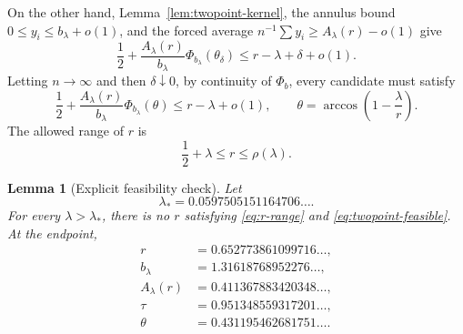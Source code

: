 \documentclass[11pt]{article}
\newtheorem{lemma}[theorem]{Lemma}
\begin{document}
On the other hand, Lemma~\ref{lem:twopoint-kernel}, the annulus bound
\(0\leq y_i\leq b_\lambda+o(1)\), and the forced average
\(n^{-1}\sum y_i\geq A_\lambda(r)-o(1)\) give
\[
        \frac12+\frac{A_\lambda(r)}{b_\lambda}
        \Phi_{b_\lambda}(\theta_\delta)
        \leq r-\lambda+\delta+o(1).
\]
Letting \(n\to\infty\) and then \(\delta\downarrow0\), by continuity of
\(\Phi_b\), every candidate must satisfy
\[
        \frac12+\frac{A_\lambda(r)}{b_\lambda}
        \Phi_{b_\lambda}(\theta)
        \leq r-\lambda+o(1),
        \qquad
        \theta=\arccos\left(1-\frac\lambda r\right).
        \tag{5.5}\label{eq:twopoint-feasible}
\]
The allowed range of $r$ is
\[
        \frac12+\lambda\leq r\leq \rho(\lambda).
        \tag{5.6}\label{eq:r-range}
\]

\begin{lemma}[Explicit feasibility check]\label{lem:numerical}
Let
\[
        \lambda_*=0.0597505151164706\ldots .
\]
For every $\lambda>\lambda_*$, there is no $r$ satisfying
\eqref{eq:r-range} and \eqref{eq:twopoint-feasible}.  At the endpoint,
\[
\begin{aligned}
        r&=0.652773861099716\ldots,\\
        b_\lambda&=1.31618768952276\ldots,\\
        A_\lambda(r)&=0.411367883420348\ldots,\\
        \tau&=0.951348559317201\ldots,\\
        \theta&=0.431195462681751\ldots .
\end{aligned}
\]
\end{lemma}
\end{document}

